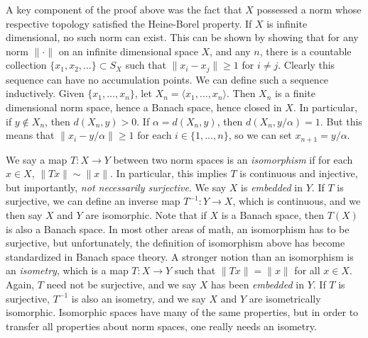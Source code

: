 \begin{remark}
    A key component of the proof above was the fact that $X$ possessed a norm whose respective topology satisfied the Heine-Borel property. If $X$ is infinite dimensional, no such norm can exist. This can be shown by showing that for any norm $\| \cdot \|$ on an infinite dimensional space $X$, and any $n$, there is a countable collection $\{ x_1, x_2, \dots \} \subset S_X$ such that $\| x_i - x_j \| \geq 1$ for $i \neq j$. Clearly this sequence can have no accumulation points. We can define such a sequence inductively. Given $\{ x_1, \dots, x_n \}$, let $X_n = \langle x_1, \dots, x_n \rangle$. Then $X_n$ is a finite dimensional norm space, hence a Banach space, hence closed in $X$. In particular, if $y \not \in X_n$, then $d(X_n,y) > 0$. If $\alpha = d(X_n,y)$, then $d(X_n,y/\alpha) = 1$. But this means that $\| x_i - y/\alpha \| \geq 1$ for each $i \in \{ 1, \dots, n \}$, so we can set $x_{n+1} = y/\alpha$.
\end{remark}

We say a map $T: X \to Y$ between two norm spaces is an {\it isomorphism} if for each $x \in X$, $\| Tx \| \sim \| x \|$. In particular, this implies $T$ is continuous and injective, but importantly, \emph{not necessarily surjective}. We say $X$ is {\it embedded} in $Y$. If $T$ is surjective, we can define an inverse map $T^{-1}: Y \to X$, which is continuous, and we then say $X$ and $Y$ are isomorphic. Note that if $X$ is a Banach space, then $T(X)$ is also a Banach space. In most other areas of math, an isomorphism has to be surjective, but unfortunately, the definition of isomorphism above has become standardized in Banach space theory. A stronger notion than an isomorphism is an {\it isometry}, which is a map $T: X \to Y$ such that $\| Tx \| = \| x \|$ for all $x \in X$. Again, $T$ need not be surjective, and we say $X$ has been {\it embedded} in $Y$. If $T$ is surjective, $T^{-1}$ is also an isometry, and we say $X$ and $Y$ are isometrically isomorphic. Isomorphic spaces have many of the same properties, but in order to transfer all properties about norm spaces, one really needs an isometry.

